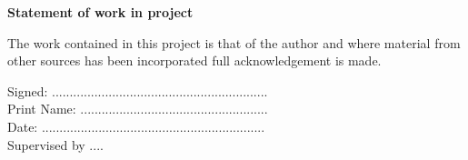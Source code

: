 
\vspace*{1cm}
\begin{center}
\textbf{\Large{Statement of work in project}}
\end{center}

\normalsize

The work contained in this project is that of the author and where
material from other sources has been incorporated full acknowledgement
is made.

\vspace{1cm}

Signed: .............................................................\\

Print Name: .....................................................\\

Date: ...............................................................\\


Supervised by ....